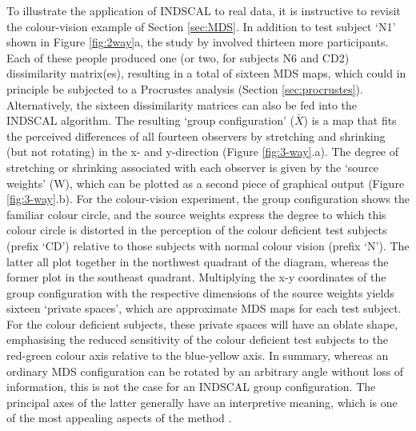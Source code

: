 \documentclass{article}
\begin{document}
To illustrate the application of INDSCAL to real data, it is
instructive to revisit the colour-vision example of Section
\ref{sec:MDS}.  In addition to test subject `N1' shown in Figure
\ref{fig:2way}a, the study by \citet{helm1964} involved thirteen more
participants. Each of these people produced one (or two, for subjects
N6 and CD2) dissimilarity matrix(es), resulting in a total of sixteen
MDS maps, which could in principle be subjected to a Procrustes
analysis (Section \ref{sec:procrustes}). Alternatively, the sixteen
dissimilarity matrices can also be fed into the INDSCAL algorithm. The
resulting `group configuration' ($\bar{X}$) is a map that fits the
perceived differences of all fourteen observers by stretching and
shrinking (but not rotating) in the x- and y-direction (Figure
\ref{fig:3-way}.a).  The degree of stretching or shrinking associated
with each observer is given by the `source weights' (W), which can be
plotted as a second piece of graphical output (Figure
\ref{fig:3-way}.b).  For the colour-vision experiment, the group
configuration shows the familiar colour circle, and the source weights
express the degree to which this colour circle is distorted in the
perception of the colour deficient test subjects (prefix `CD')
relative to those subjects with normal colour vision (prefix `N'). The
latter all plot together in the northwest quadrant of the diagram,
whereas the former plot in the southeast quadrant. Multiplying the x-y
coordinates of the group configuration with the respective dimensions
of the source weights yields sixteen `private spaces', which are
approximate MDS maps for each test subject. For the colour deficient
subjects, these private spaces will have an oblate shape, emphasising
the reduced sensitivity of the colour deficient test subjects to the
red-green colour axis relative to the blue-yellow axis. In summary,
whereas an ordinary MDS configuration can be rotated by an arbitrary
angle without loss of information, this is not the case for an INDSCAL
group configuration. The principal axes of the latter generally have
an interpretive meaning, which is one of the most appealing aspects of
the method \citep{arabie1987, borg2005}.\\
\end{document}

